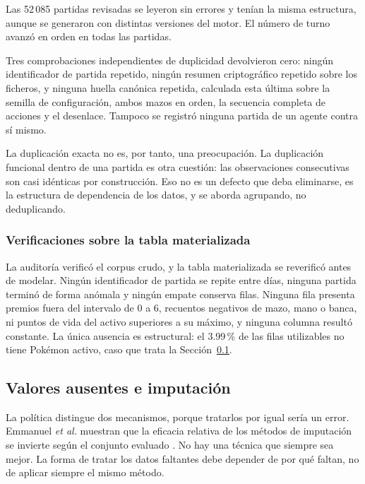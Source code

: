 Las 52\,085 partidas revisadas se leyeron sin errores y tenían la misma
estructura, aunque se generaron con distintas versiones del motor. El número
de turno avanzó en orden en todas las partidas.

Tres comprobaciones independientes de duplicidad devolvieron cero: ningún
identificador de partida repetido, ningún resumen criptográfico repetido
sobre los ficheros, y ninguna huella canónica repetida, calculada esta
última sobre la semilla de configuración, ambos mazos en orden, la secuencia
completa de acciones y el desenlace. Tampoco se registró ninguna partida de
un agente contra sí mismo.

La duplicación exacta no es, por tanto, una preocupación. La duplicación
funcional dentro de una partida es otra cuestión: las observaciones
consecutivas son casi idénticas por construcción. Eso no es un defecto que
deba eliminarse, es la estructura de dependencia de los datos, y se
aborda agrupando, no deduplicando.

\subsubsection{Verificaciones sobre la tabla materializada}

La auditoría verificó el corpus crudo, y la tabla materializada se
reverificó antes de modelar. Ningún identificador de partida se repite entre
días, ninguna partida terminó de forma anómala y ningún empate conserva
filas. Ninguna fila presenta premios fuera del intervalo de 0 a 6,
recuentos negativos de mazo, mano o banca, ni puntos de vida del activo
superiores a su máximo, y ninguna columna resultó constante. La única
ausencia es estructural: el 3.99\,\% de las filas utilizables no tiene
Pok\'emon activo, caso que trata la Sección~\ref{subsec:imputacion}.

\subsection{Valores ausentes e imputación}
\label{subsec:imputacion}

La política distingue dos mecanismos, porque tratarlos por igual sería un
error. Emmanuel \textit{et al.} muestran que la eficacia relativa de los
métodos de imputación se invierte según el conjunto evaluado
\cite{emmanuel_missing_2021}. No hay una técnica que siempre sea mejor. La
forma de tratar los datos faltantes debe depender de por qué faltan, no de
aplicar siempre el mismo método.

